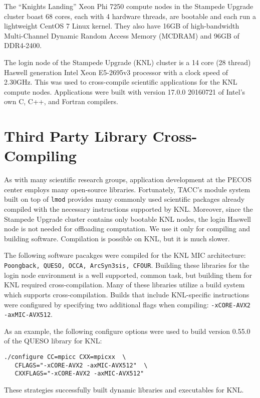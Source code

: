 The ``Knights Landing'' Xeon Phi 7250 compute nodes in the Stampede Upgrade
cluster boast 68 cores, each with 4 hardware threads, are bootable and each run
a lightweight CentOS 7 Linux kernel.  They also have 16GB of high-bandwidth
Multi-Channel Dynamic Random Access Memory (MCDRAM) and 96GB of DDR4-2400.

The login node of the Stampede Upgrade (KNL) cluster is a 14 core (28 thread)
Haswell generation Intel Xeon E5-2695v3 processor with a clock speed of
2.30GHz.  This was used to cross-compile scientific applications for the KNL
compute nodes.  Applications were built with version 17.0.0 20160721 of Intel's
own C, C++, and Fortran compilers.

\section{Third Party Library Cross-Compiling}
\label{sec:cross_compile}

As with many scientific research groups, application development at the PECOS
center employs many open-source libraries.  Fortunately, TACC's module system
built on top of \texttt{lmod} provides many commonly used scientific packages
already compiled with the necessary instructions supported by KNL.  Moreover,
since the Stampede Upgrade cluster contains only bootable KNL nodes, the login
Haswell node is not needed for offloading computation.  We use it only for
compiling and building software.  Compilation is possible on KNL, but it is
much slower.

The following software pacakges were compiled for the KNL MIC architecture:
\texttt{Poongback, QUESO, OCCA, ArcSyn3sis, CFOUR}.  Building these libraries
for the login node environment is a well supported, common task, but building
them for KNL required cross-compilation.  Many of these libraries utilize a
build system which supports cross-compilation.  Builds that include
KNL-specific instructions were configured by specifying two additional flags
when compiling: \texttt{-xCORE-AVX2 -axMIC-AVX512}.

As an example, the following configure options were used to build version
0.55.0 of the QUESO library for KNL:

{\small
\begin{verbatim}
./configure CC=mpicc CXX=mpicxx  \
   CFLAGS="-xCORE-AVX2 -axMIC-AVX512"  \
   CXXFLAGS="-xCORE-AVX2 -axMIC-AVX512"
\end{verbatim}
}

These strategies successfully built dynamic libraries and executables for KNL.
